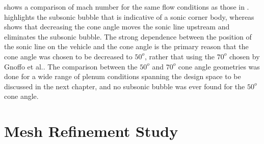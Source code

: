  shows a comparison of mach number for the same flow
conditions as those in .
 highlights the subsonic bubble that is indicative of a
sonic corner body, whereas  shows that decreasing the cone
angle moves the sonic line upstream and eliminates the subsonic bubble.  The
strong dependence between the position of the sonic line on the vehicle and the
cone angle is the primary reason that the cone angle was chosen to be decreased
to $50^o$, rather that using the $70^o$ chosen by Gnoffo et
al.\cite{gnoffo2016tapping}.  The comparison between the $50^o$ and $70^o$ cone
angle geometries was done for a wide range of plenum conditions spanning the
design space to be discussed in the next chapter, and no subsonic bubble was
ever found for the $50^o$ cone angle.

\section{Mesh Refinement Study}
\label{sec:mesh-refinement-study}

